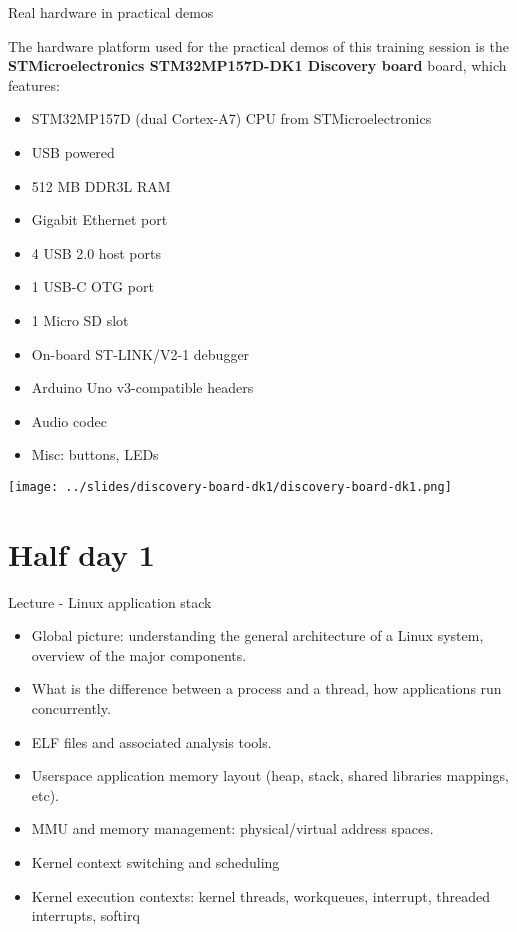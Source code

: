 \documentclass[a4paper,12pt,obeyspaces,spaces,hyphens]{article}
\begin{document}
\feagendatwocolumn
{Real hardware in practical demos}
{
  The hardware platform used for the practical demos of this training
  session is the {\bf STMicroelectronics STM32MP157D-DK1 Discovery
    board} board, which features:

  \begin{itemize}
  \item STM32MP157D (dual Cortex-A7) CPU from STMicroelectronics
  \item USB powered
  \item 512 MB DDR3L RAM
  \item Gigabit Ethernet port
  \item 4 USB 2.0 host ports
  \item 1 USB-C OTG port
  \item 1 Micro SD slot
  \item On-board ST-LINK/V2-1 debugger
  \item Arduino Uno v3-compatible headers
  \item Audio codec
  \item Misc: buttons, LEDs
  \end{itemize}
}
{}
{
  \begin{center}
  \texttt{[image: ../slides/discovery-board-dk1/discovery-board-dk1.png]}
  \end{center}
}

\section{Half day 1}

\feagendaonecolumn
{Lecture - Linux application stack}
{
  \begin{itemize}
  \item Global picture: understanding the general architecture of a
        Linux system, overview of the major components.
  \item What is the difference between a process and a thread, how
    applications run concurrently.
  \item ELF files and associated analysis tools.
  \item Userspace application memory layout (heap, stack, shared
    libraries mappings, etc).
  \item MMU and memory management: physical/virtual address spaces.
  \item Kernel context switching and scheduling
  \item Kernel execution contexts: kernel threads, workqueues,
    interrupt, threaded interrupts, softirq
  \end{itemize}
}
\end{document}
